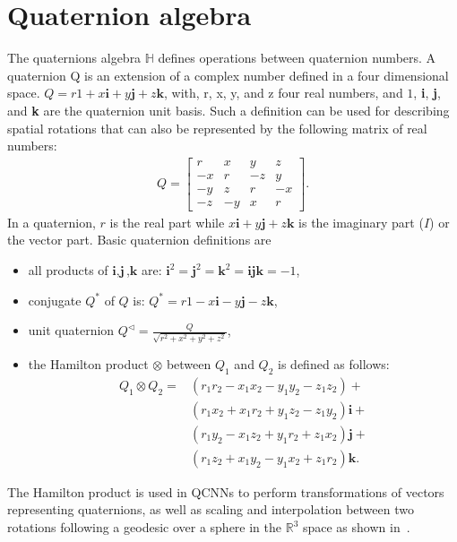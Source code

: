 \documentclass[a4paper]{article}
\def\i{\textbf{i}}
\def\j{\textbf{j}}
\def\k{\textbf{k}}
\begin{document}
\section{Quaternion algebra}
\label{sec:qalgebra}
The quaternions algebra $\mathbb{H}$ defines operations between quaternion numbers. A quaternion Q is  an extension of a complex number defined in a four dimensional space. $Q = r1 + x\i + y\j + z\textbf{k}$, with, r, x, y, and z four real numbers, and $1$, \i, \j, and \textbf{k} are the quaternion unit basis. Such a definition can be used for describing spatial rotations that can also be represented by the following matrix of real numbers:
\begin{align}
Q = 
\begin{bmatrix}
   r & x & y & z \\
   -x & r & -z & y \\
   -y & z & r & -x \\
   -z & -y & x & r 
\end{bmatrix}.
\end{align}
In a quaternion, $r$ is the real part while $x\i+y\j+z\k$ is the imaginary part ($I$) or the vector part.
Basic quaternion definitions are
\begin{itemize}
\renewcommand{\labelitemi}{$\bullet$}
\item all products of $\i,\j$,$\k$ are: $\i^2=\j^2=\k^2=\i\j\k=-1$,
\item conjugate $Q^*$ of $Q$ is: $Q^*=r1-x\i-y\j-z\k$,
\label{eq:conjugate}
\item unit quaternion $Q^\triangleleft=\frac{Q}{\sqrt{r^2+x^2+y^2+z^2}}$,
\label{eq:normalized}
\label{eq:norm}
\item the Hamilton product $\otimes$ between $Q_1$ and $Q_2$ is defined as follows: 
\begin{align}
Q_1 \otimes Q_2=&(r_1r_2-x_1x_2-y_1y_2-z_1z_2)+\nonumber \\
			&(r_1x_2+x_1r_2+y_1z_2-z_1y_2)\i+\nonumber \\
            &(r_1y_2-x_1z_2+y_1r_2+z_1x_2)\j+\nonumber \\
            &(r_1z_2+x_1y_2-y_1x_2+z_1r_2)\k.
\label{eq:hamilton}
\nonumber
\end{align}
\end{itemize}
The Hamilton product is used in QCNNs to perform transformations of vectors representing quaternions, as well as scaling and interpolation between two rotations following a geodesic over a sphere in the $\mathbb{R}^3$ space as shown in~\cite{minemoto2017feed}.
\end{document}
